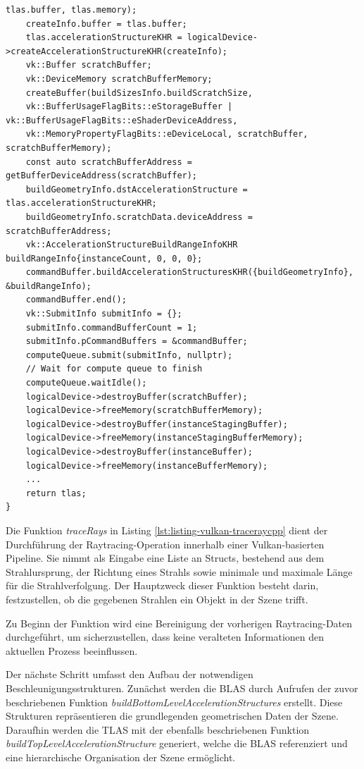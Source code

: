 \documentclass[11pt]{scrartcl}
\begin{document}
\begin{lstlisting}[caption={Erzeugung der Top-Level Acceleration Structure in VulkanRenderer.cpp},label={lst:listing-vulkan-createtlascpp}]
	tlas.buffer, tlas.memory);
	createInfo.buffer = tlas.buffer;
	tlas.accelerationStructureKHR = logicalDevice->createAccelerationStructureKHR(createInfo);
	vk::Buffer scratchBuffer;
	vk::DeviceMemory scratchBufferMemory;
	createBuffer(buildSizesInfo.buildScratchSize,
	vk::BufferUsageFlagBits::eStorageBuffer | vk::BufferUsageFlagBits::eShaderDeviceAddress,
	vk::MemoryPropertyFlagBits::eDeviceLocal, scratchBuffer, scratchBufferMemory);
	const auto scratchBufferAddress = getBufferDeviceAddress(scratchBuffer);
	buildGeometryInfo.dstAccelerationStructure = tlas.accelerationStructureKHR;
	buildGeometryInfo.scratchData.deviceAddress = scratchBufferAddress;
	vk::AccelerationStructureBuildRangeInfoKHR buildRangeInfo{instanceCount, 0, 0, 0};
	commandBuffer.buildAccelerationStructuresKHR({buildGeometryInfo}, &buildRangeInfo);
	commandBuffer.end();
	vk::SubmitInfo submitInfo = {};
	submitInfo.commandBufferCount = 1;
	submitInfo.pCommandBuffers = &commandBuffer;
	computeQueue.submit(submitInfo, nullptr);
	// Wait for compute queue to finish
	computeQueue.waitIdle();
	logicalDevice->destroyBuffer(scratchBuffer);
	logicalDevice->freeMemory(scratchBufferMemory);
	logicalDevice->destroyBuffer(instanceStagingBuffer);
	logicalDevice->freeMemory(instanceStagingBufferMemory);
	logicalDevice->destroyBuffer(instanceBuffer);
	logicalDevice->freeMemory(instanceBufferMemory);
	...
	return tlas;
}	\end{lstlisting}
	
	Die Funktion \textit{traceRays} in Listing \ref{lst:listing-vulkan-traceraycpp} dient der Durchführung der Raytracing-Operation innerhalb einer Vulkan-basierten Pipeline. Sie nimmt als Eingabe eine Liste an Structs, bestehend aus dem Strahlursprung, der Richtung eines Strahls sowie minimale und maximale Länge für die Strahlverfolgung. Der Hauptzweck dieser Funktion besteht darin, festzustellen, ob die gegebenen Strahlen ein Objekt in der Szene trifft.
	
	Zu Beginn der Funktion wird eine Bereinigung der vorherigen Raytracing-Daten durchgeführt, um sicherzustellen, dass keine veralteten Informationen den aktuellen Prozess beeinflussen.
	
	Der nächste Schritt umfasst den Aufbau der notwendigen Beschleunigungsstrukturen. Zunächst werden die BLAS durch Aufrufen der zuvor beschriebenen Funktion \textit{buildBottomLevelAccelerationStructures} erstellt. Diese Strukturen repräsentieren die grundlegenden geometrischen Daten der Szene. Daraufhin werden die TLAS mit der ebenfalls beschriebenen Funktion \textit{buildTopLevelAccelerationStructure} generiert, welche die BLAS referenziert und eine hierarchische Organisation der Szene ermöglicht.
	
\end{document}
